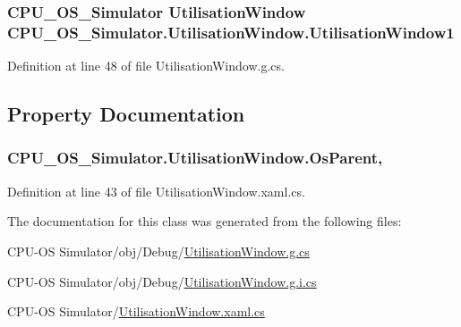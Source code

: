\subsubsection[{Utilisation\+Window1}]{\setlength{\rightskip}{0pt plus 5cm}C\+P\+U\+\_\+\+O\+S\+\_\+\+Simulator {\bf Utilisation\+Window} C\+P\+U\+\_\+\+O\+S\+\_\+\+Simulator.\+Utilisation\+Window.\+Utilisation\+Window1\hspace{0.3cm}{\ttfamily [package]}}\label{class_c_p_u___o_s___simulator_1_1_utilisation_window_a702f7f3600001706fb93aa48fd2049c1}


Definition at line 48 of file Utilisation\+Window.\+g.\+cs.



\subsection{Property Documentation}
\hypertarget{class_c_p_u___o_s___simulator_1_1_utilisation_window_a7fe83f09dda5e9ac3d36c2b2736d74ce}{}
\subsubsection[{Os\+Parent}]{ C\+P\+U\+\_\+\+O\+S\+\_\+\+Simulator.\+Utilisation\+Window.\+Os\+Parent\hspace{0.3cm}{\ttfamily [get]}, {\ttfamily [set]}}\label{class_c_p_u___o_s___simulator_1_1_utilisation_window_a7fe83f09dda5e9ac3d36c2b2736d74ce}


Definition at line 43 of file Utilisation\+Window.\+xaml.\+cs.



The documentation for this class was generated from the following files\+:\begin{DoxyCompactItemize}
\item 
C\+P\+U-\/\+O\+S Simulator/obj/\+Debug/\hyperlink{_utilisation_window_8g_8cs}{Utilisation\+Window.\+g.\+cs}\item 
C\+P\+U-\/\+O\+S Simulator/obj/\+Debug/\hyperlink{_utilisation_window_8g_8i_8cs}{Utilisation\+Window.\+g.\+i.\+cs}\item 
C\+P\+U-\/\+O\+S Simulator/\hyperlink{_utilisation_window_8xaml_8cs}{Utilisation\+Window.\+xaml.\+cs}\end{DoxyCompactItemize}
